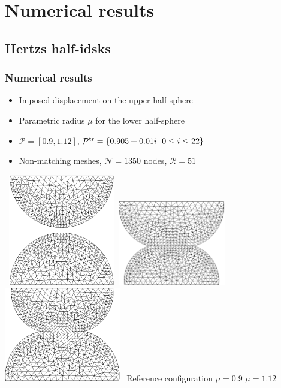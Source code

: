 
\section{Numerical results}
\subsection{Hertzs half-idsks}
\begin{frame}\frametitle{Numerical results}
	\textbf{}
	\begin{itemize}
		\item Imposed displacement on the upper half-sphere
		\item Parametric radius $\mu$ for the lower half-sphere
		\item $\mathcal P = [0.9, 1.12]$, $\mathcal P^{\rm tr} = \{0.905+0.01i | \ 0\leq i\leq 22\}$
		\item Non-matching meshes, $\mathcal N = 1350$ nodes, $\mathcal R = 51$
	\end{itemize}
	\hspace{-0.5cm}
	\mbox{
		\includegraphics[width=0.35\textwidth]{./images/contact/ref_config.png}
		\includegraphics[width=0.35\textwidth]{./images/contact/contact_09.png}
		\includegraphics[width=0.38\textwidth]{./images/contact/contact.png}
	}
	\vspace{-0.3cm}
	\hspace{-0.2cm}
	Reference configuration 
	\qquad\qquad $\mu = 0.9$
	\hspace{3cm} $\mu = 1.12$
\end{frame}


